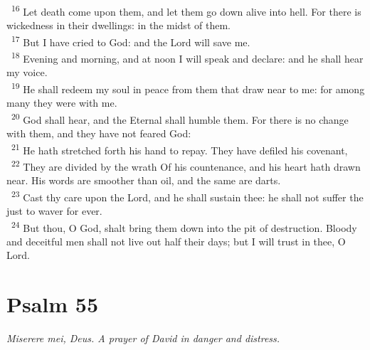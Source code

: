 \documentclass[a5paper,12pt]{article}
\begin{document}
\begin{multicols*}{2}
~\textsuperscript{16} Let death come upon them, and let them go down alive into hell. For there is wickedness in their dwellings: in the midst of them.\\
~\textsuperscript{17} But I have cried to God: and the Lord will save me.\\
~\textsuperscript{18} Evening and morning, and at noon I will speak and declare: and he shall hear my voice.\\
~\textsuperscript{19} He shall redeem my soul in peace from them that draw near to me: for among many they were with me.\\
~\textsuperscript{20} God shall hear, and the Eternal shall humble them. For there is no change with them, and they have not feared God:\\
~\textsuperscript{21} He hath stretched forth his hand to repay. They have defiled his covenant,\\
~\textsuperscript{22} They are divided by the wrath Of his countenance, and his heart hath drawn near. His words are smoother than oil, and the same are darts.\\
~\textsuperscript{23} Cast thy care upon the Lord, and he shall sustain thee: he shall not suffer the just to waver for ever.\\
~\textsuperscript{24} But thou, O God, shalt bring them down into the pit of destruction. Bloody and deceitful men shall not live out half their days; but I will trust in thee, O Lord.\\

\section{Psalm 55}
\label{sec:org593aa71}
\emph{Miserere mei, Deus. A prayer of David in danger and distress.}\\


\end{multicols*}
\end{document}
